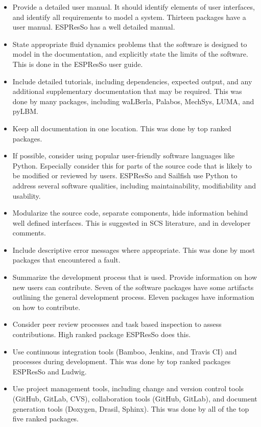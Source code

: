 \documentclass[final, 3p, times, authoryear]{elsarticle}
\begin{document}
\begin{itemize}
	\item Provide a detailed user manual. It should identify elements of user
	interfaces, and identify all requirements to model a system. Thirteen
	packages have a user manual. ESPResSo has a well detailed manual.
	\item State appropriate fluid dynamics problems that the software is
	designed to model in the documentation, and explicitly state the limits of
	the software. This is done in the ESPResSo user guide.
	\item Include detailed tutorials, including dependencies, expected output,
	and any additional supplementary documentation that may be required. This
	was done by many packages, including waLBerla, Palabos, MechSys, LUMA, and
	pyLBM.
	\item Keep all documentation in one location. This was done by top ranked packages.
	\item If possible, consider using popular user-friendly software languages
	like Python. Especially consider this for parts of the source code that is
	likely to be modified or reviewed by users. ESPResSo and Sailfish use Python
	to address several software qualities, including maintainability,
	modifiability and usability.
	\item Modularize the source code, separate components, hide information
	behind well defined interfaces. This is suggested in SCS literature, and in
	developer comments.
	\item Include descriptive error messages where appropriate. This was done by
	most packages that encountered a fault.
	\item Summarize the development process that is used. Provide information on
	how new users can contribute. Seven of the software packages have some
	artifacts outlining the general development process. Eleven packages have
	information on how to contribute.
	\item Consider peer review processes and task based inspection to assess
	contributions. High ranked package ESPResSo does this.
	\item Use continuous integration tools (Bamboo, Jenkins, and Travis CI) and
	processes during development. This was done by top ranked packages ESPResSo
	and Ludwig.
	\item Use project management tools, including change and version control
	tools (GitHub, GitLab, CVS), collaboration tools (GitHub, GitLab), and
	document generation tools (Doxygen, Drasil, Sphinx). This was done by all of
	the top five ranked packages.
\end{itemize}
\end{document}
